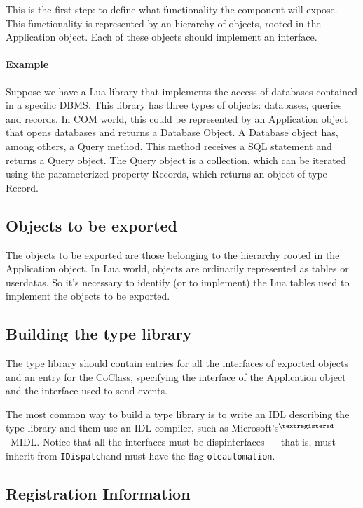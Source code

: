 \documentclass[11pt,a4paper,english]{report}
\newcommand{\ident}[1]{\mbox{\texttt{#1}}}
\newcommand{\idispatch}{\ident{IDispatch}}
\newcommand{\registered}{$^{\textregistered}$}
\begin{document}
This is the first step: to define what functionality the component
will expose. This functionality is represented by an hierarchy of
objects, rooted in the Application object. Each of these objects
should implement an interface.

\paragraph{Example} Suppose we have a Lua library that implements the
access of databases contained in a specific DBMS. This library has
three types of objects: databases, queries and records. In COM world,
this could be represented by an Application object that opens
databases and returns a Database Object. A Database object has, among
others, a Query method. This method receives a SQL statement and
returns a Query object. The Query object is a collection, which can be
iterated using the parameterized property Records, which returns an
object of type Record.


\subsection{Objects to be exported}

The objects to be exported are those belonging to the hierarchy rooted
in the Application object. In Lua world, objects are ordinarily
represented as tables or userdatas. So it's necessary to identify (or
to implement) the Lua tables used to implement the objects to be
exported.



\subsection{Building the type library}

The type library should contain entries for all the interfaces of
exported objects and an entry for the CoClass, specifying the
interface of the Application object and the interface used to send
events.

The most common way to build a type library is to write an IDL
describing the type library and them use an IDL compiler, such as
Microsoft's\registered\ MIDL. Notice that all the interfaces must be
dispinterfaces --- that is, must inherit from \idispatch and must have
the flag \texttt{oleautomation}.



\subsection{Registration Information}
\end{document}

